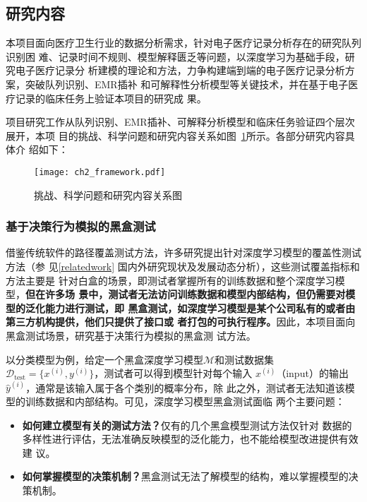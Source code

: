 \subsection{研究内容}\label{ch2content}

本项目面向医疗卫生行业的数据分析需求，针对电子医疗记录分析存在的研究队列识别困
难、记录时间不规则、模型解释匮乏等问题，以深度学习为基础手段，研究电子医疗记录分
析建模的理论和方法，力争构建端到端的电子医疗记录分析方案，突破队列识别、EMR插补
和可解释性分析模型等关键技术，并在基于电子医疗记录的临床任务上验证本项目的研究成
果。

项目研究工作从队列识别、EMR插补、可解释分析模型和临床任务验证四个层次展开，本项
目的挑战、科学问题和研究内容关系如图~\ref{fig:ch2:rc}所示。各部分研究内容具体介
绍如下：

\begin{figure}[htp]
    \begin{small}
        \begin{center}
            \texttt{[image: ch2\_framework.pdf]}
        \end{center}
        \caption{挑战、科学问题和研究内容关系图}
        \label{fig:ch2:rc}
    \end{small}
\end{figure}

\subsubsection{基于决策行为模拟的黑盒测试}

借鉴传统软件的路径覆盖测试方法，许多研究提出针对深度学习模型的覆盖性测试方法（参
见\ref{relatedwork} 国内外研究现状及发展动态分析），这些测试覆盖指标和方法主要是
针对白盒的场景，即测试者掌握所有的训练数据和整个深度学习模型，\textbf{但在许多场
景中，测试者无法访问训练数据和模型内部结构，但仍需要对模型的泛化能力进行测试，即
黑盒测试，如深度学习模型是某个公司私有的或者由第三方机构提供，他们只提供了接口或
者打包的可执行程序。}因此，本项目面向黑盒测试场景，研究基于决策行为模拟的黑盒测
试方法。

以分类模型为例，给定一个黑盒深度学习模型$\mathcal M$和测试数据集$\mathcal
D_{\text{test}}=\{x^{(i)},y^{(i)}\}$，测试者可以得到模型针对每个输入
$x^{(i)}$（input）的输出$\hat{y}^{(i)}$，通常是该输入属于各个类别的概率分布，除
此之外，测试者无法知道该模型的训练数据和内部结构。可见，深度学习模型黑盒测试面临
两个主要问题：
\begin{itemize}
    \item \textbf{如何建立模型有关的测试方法？}仅有的几个黑盒模型测试方法仅针对
    数据的多样性进行评估，无法准确反映模型的泛化能力，也不能给模型改进提供有效建
    议。
    \item \textbf{如何掌握模型的决策机制？}黑盒测试无法了解模型的结构，难以掌握模型的决策机制。
\end{itemize}

